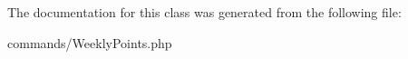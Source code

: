 

The documentation for this class was generated from the following file\+:\begin{DoxyCompactItemize}
\item 
commands/Weekly\+Points.\+php\end{DoxyCompactItemize}
